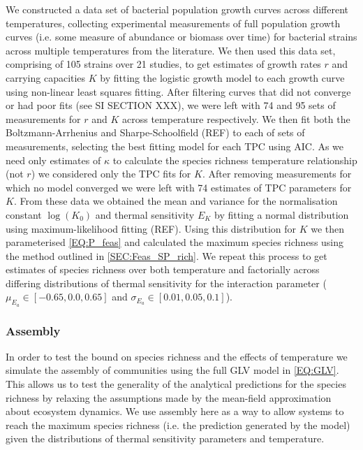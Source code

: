 \documentclass{article}
\begin{document}
We constructed a data set of bacterial population growth curves across different temperatures, collecting experimental measurements of full population growth curves (i.e. some measure of abundance or biomass over time) for bacterial strains across multiple temperatures from the literature. We then used this data set, comprising of 105 strains over 21 studies, to get estimates of growth rates $r$ and carrying capacities $K$ by fitting the logistic growth model to each growth curve using non-linear least squares fitting. After filtering curves that did not converge or had poor fits (see SI SECTION XXX), we were left with 74 and 95 sets of measurements for $r$ and $K$ across temperature respectively. We then fit both the Boltzmann-Arrhenius and Sharpe-Schoolfield (REF) to each of sets of measurements, selecting the best fitting model for each TPC using AIC. As we need only estimates of $\kappa$ to calculate the species richness temperature relationship (not $r$) we considered only the TPC fits for $K$. After removing measurements for which no model converged we were left with 74 estimates of TPC parameters for $K$. From these data we obtained the mean and variance for the normalisation constant $\log(K_0)$ and thermal sensitivity $E_K$ by fitting a normal distribution using maximum-likelihood fitting (REF). Using this distribution for $K$ we then parameterised \cref{EQ:P_feas} and calculated the maximum species richness using the method outlined in \cref{SEC:Feas_SP_rich}. We repeat this process to get estimates of species richness over both temperature and factorially across differing distributions of thermal sensitivity for the interaction parameter ($\mu_{E_a} \in [-0.65, 0.0, 0.65]$ and $\sigma_{E_a} \in [0.01, 0.05, 0.1]$).

\subsubsection{Assembly}
In order to test the bound on species richness and the effects of temperature we simulate the assembly of communities using the full GLV model in \cref{EQ:GLV}. This allows us to test the generality of the analytical predictions for the species richness by relaxing the assumptions made by the mean-field approximation about ecosystem dynamics. We use assembly here as a way to allow systems to reach the maximum species richness (i.e. the prediction generated by the model) given the distributions of thermal sensitivity parameters and temperature. 
\end{document}
